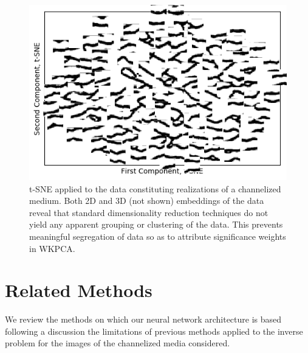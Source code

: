 \documentclass{article}
\begin{document}
\begin{figure}[h]
\centering
\includegraphics[width=\linewidth,scale=0.2]{figures/OptSnapshots_32_tSNE2.png}
  \caption{t-SNE applied to the data constituting realizations of a channelized medium.  Both 2D and 3D (not shown) embeddings of the data reveal that standard dimensionality reduction techniques do not yield any apparent grouping or clustering of the data.  This prevents meaningful segregation of data so as to attribute significance weights in WKPCA. }
\end{figure}\label{tSNE}





\section{Related Methods}\label{related}

	We review the methods on which our neural network architecture is based following a discussion the limitations of previous methods applied to the inverse problem for the images of the channelized media considered.
    
\end{document}
